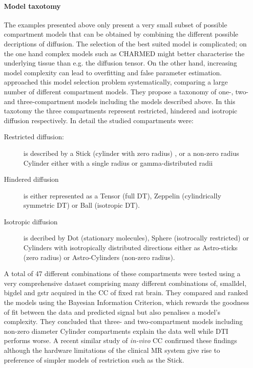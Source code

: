 \paragraph*{Model taxotomy}
The examples presented above only present a very small subset of possible compartment models that can be obtained by combining the different possible decriptions of diffusion. The selection of the best suited model is complicated; on the one hand complex models such as CHARMED might better characterise the underlying tissue than e.g. the diffusion tensor. On the other hand, increasing model complexity can lead to overfitting and false parameter estimation. \citet{Panagiotaki:2012} approached this model selection problem systematically, comparing a large number of different compartment models. They propose a taxonomy of one-, two- and three-compartment models including the models described above. In this taxotomy the three compartments represent restricted, hindered and isotropic diffusion respectively. In detail the studied compartments were:
\begin{description}
	\item[Restricted diffusion:] is described by a Stick (cylinder with zero radius) , or a non-zero radius Cylinder either with a single radius or gamma-distributed radii
	\item[Hindered diffusion] is either represented as a Tensor (full \gls{DT}), Zeppelin (cylindrically symmetric \gls{DT}) or Ball  (isotropic \gls{DT}).  
	\item[Isotropic diffusion] is decribed by Dot (stationary molecules), Sphere (isotrocally restricted) or Cylinders with isotropically distributed directions either as Astro-sticks (zero radius)  or Astro-Cylinders (non-zero radius).
\end{description}


A total of 47 different combinations of these compartments were tested using a very comprehensive dataset comprising many different combinations of, \gls{smalldel}, \gls{bigdel} and \gls{gstr} acquired in the \gls{CC} of fixed rat brain. They compared and ranked the models using the Bayesian Information Criterion, which rewards the goodness of fit between the data and predicted signal but also penalises a model's complexity.  They concluded that three- and two-compartment models including non-zero diameter Cylinder compartments explain the data well while DTI performs worse. A recent similar study of \emph{in-vivo} \gls{CC} \citep{Ferizi:2012} confirmed these findings although the hardware limitations of the clinical MR system give rise to preference of simpler models of restriction such as the Stick.


